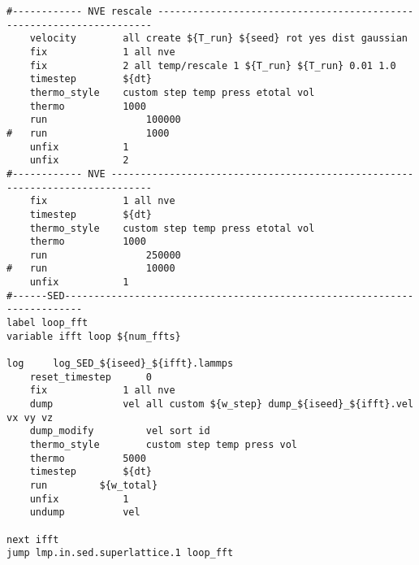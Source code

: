\begin{singlespace}
\begin{verbatim}
#------------ NVE rescale ---------------------------------------------------------------------	
	velocity 		all create ${T_run} ${seed} rot yes dist gaussian
	fix 			1 all nve
	fix 			2 all temp/rescale 1 ${T_run} ${T_run} 0.01 1.0
	timestep		${dt}
	thermo_style  	custom step temp press etotal vol
	thermo			1000
	run             	100000	
#	run             	1000
	unfix 			1
	unfix 			2
#------------ NVE -----------------------------------------------------------------------------	
	fix 			1 all nve
	timestep		${dt}
	thermo_style  	custom step temp press etotal vol
	thermo			1000
	run             	250000	
#	run             	10000
	unfix 			1
#------SED-------------------------------------------------------------------------
label loop_fft
variable ifft loop ${num_ffts}

log 	log_SED_${iseed}_${ifft}.lammps
	reset_timestep  	0
	fix 			1 all nve
	dump 			vel all custom ${w_step} dump_${iseed}_${ifft}.vel vx vy vz
	dump_modify 		vel sort id
	thermo_style 		custom step temp press vol
	thermo			5000
	timestep		${dt}
	run			${w_total}
	unfix			1
	undump			vel

next ifft
jump lmp.in.sed.superlattice.1 loop_fft

\end{verbatim}
\end{singlespace}
